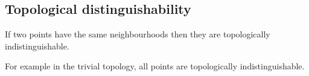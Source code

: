 
\subsection{Topological distinguishability}

If two points have the same neighbourhoods then they are topologically indistinguishable.

For example in the trivial topology, all points are topologically indistinguishable.

